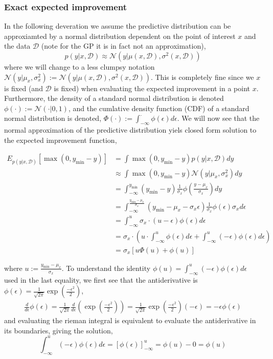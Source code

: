 \subsubsection{Exact expected improvement}
In the following deveration
we assume the predictive distribution can be approxiamted by a normal distribution dependent on
the point of interest $x$ and the data $\mathcal{D}$ (note for the GP
it is in fact not an approximation), 
$$p(y|x,\mathcal{D}) \approx \mathcal{N}(y|\mu(x,\mathcal{D}), \sigma^2(x,\mathcal{D}))$$ where we
will change to a less clumpsy notation $\mathcal{N}(y|\mu_x,
\sigma^2_x):=\mathcal{N}(y|\mu(x,\mathcal{D}), \sigma^2(x,\mathcal{D}))$. This is completely fine
since we $x$ is fixed (and $\mathcal{D}$ is fixed) when evaluating the expected improvement in a point
$x$. %
Furthermore, the density of
a standard normal distribution is denoted $\phi(\cdot):=\mathcal{N}(\cdot | 0,1)$, and the cumlative
density function (CDF) of a standard normal distribution is denoted, $\Phi(\cdot) :=
\int_{-\infty}^{\cdot} \phi(\epsilon)d\epsilon$. We will now see that the normal approximation
of the predictive distribution yiels closed form solution to the expected improvement function, 

\begin{align*}
    E_{p(y|x,\mathcal{D})}[\max(0,y_{\min}-y)] &= \int \max(0,y_{\min}-y) p(y|x,\mathcal{D}) dy\\
    &\approx \int \max(0,y_{\min}-y) \mathcal{N}(y|\mu_x, \sigma_x^2) dy\\
    &= \int_{-\infty}^{y_{\min}} (y_{\min}-y) \frac{1}{\sigma_x}\phi\left(\frac{y-\mu_x}{\sigma_x}\right) dy\\
    &= \int_{-\infty}^{\frac{y_{\min}-\mu_x}{\sigma_x}} (y_{\min}-\mu_x-\sigma_x\epsilon) \frac{1}{\sigma_x}\phi\left(\epsilon\right) \sigma_x d\epsilon\\
    &= \int_{-\infty}^u \sigma_x \cdot (u-\epsilon) \phi(\epsilon) d\epsilon\\
    &=  \sigma_x \cdot \left( u\cdot \int_{-\infty}^u \phi(\epsilon) d\epsilon +\int_{-\infty}^u (-\epsilon)  \phi(\epsilon) d\epsilon \right) \\
    &= \sigma_x [u\Phi(u)+ \phi(u)]
\end{align*}

where $u:=\frac{y_{\min}-\mu_x}{\sigma_x}$. To understand the identity $\phi(u) = \int_{-\infty}^u
(-\epsilon)  \phi(\epsilon) d\epsilon$ used in the last equality, we first see that the antiderivative
is $\phi(\epsilon) = \frac{1}{\sqrt{2\pi}} \exp(\frac{-\epsilon^2}{2})$,
\begin{align*}
    \frac{d}{d \epsilon} \phi(\epsilon) =  \frac{1}{\sqrt{2\pi}}\frac{d}{d \epsilon} \left( \exp(\frac{-\epsilon^2}{2}) \right)
    =  \frac{1}{\sqrt{2\pi}}\exp(\frac{-\epsilon^2}{2})(-\epsilon)
    = -\epsilon \phi(\epsilon)
\end{align*}
and evaluating the rieman integral is equivalent to evaluate the antiderivative in its boundaries, giving the 
solution, 
$$\int_{-\infty}^u
(-\epsilon)  \phi(\epsilon) d\epsilon = \left[\phi(\epsilon)\right]_{-\infty}^u = \phi(u)-0 = \phi(u)$$ 

